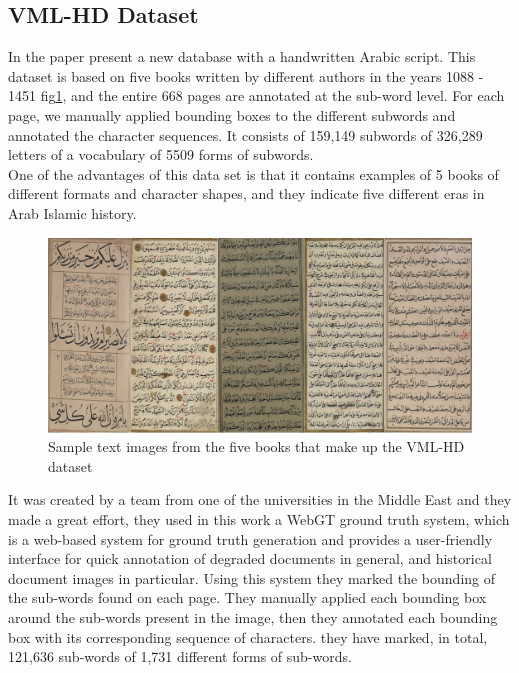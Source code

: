 \subsection{VML-HD Dataset}
In the paper \cite{VMLHD} present a new database with a handwritten Arabic script. This dataset is based on five books written by different authors in the years 1088 - 1451 fig\ref{fig:VML-HD sample dataset}, and the entire 668 pages are annotated at the sub-word level. For each page, we manually applied bounding boxes to the different subwords and annotated the character sequences. It consists of 159,149 subwords of 326,289 letters of a vocabulary of 5509 forms of subwords. \\
One of the advantages of this data set is that it contains examples of 5 books of different formats and character shapes, and they indicate five different eras in Arab Islamic history.

\begin{figure}[!htb]
    \centering
    \includegraphics[width=15cm]{images/vml-hd-sample.PNG}
    \caption{Sample text images from the five books that make up the VML-HD dataset}
    \label{fig:VML-HD sample dataset}
\end{figure}

It was created by a team from one of the universities in the Middle East and they made a great effort, they used in this work a WebGT ground truth system\cite{biller2013webgt}, which is a web-based system for ground truth generation and provides a user-friendly interface for quick annotation of degraded documents in general, and historical document images in particular. Using this system they marked the bounding of the sub-words found on each page. They manually applied each bounding box around the sub-words present in the image, then they annotated each bounding box with its corresponding sequence of characters. they have marked, in total, 121,636 sub-words of 1,731 different forms of sub-words.\cite{VMLHD}


